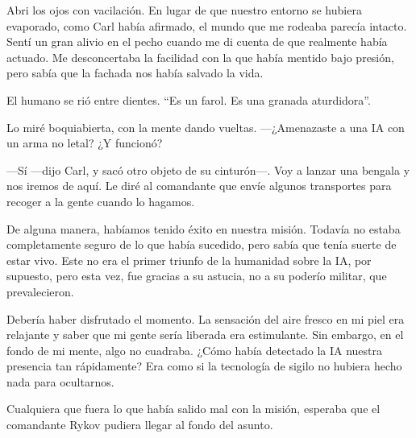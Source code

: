 Abri los ojos con vacilación. En lugar de que nuestro entorno se hubiera evaporado, como Carl había afirmado, el mundo que me rodeaba parecía intacto. Sentí un gran alivio en el pecho cuando me di cuenta de que realmente había actuado. Me desconcertaba la facilidad con la que había mentido bajo presión, pero sabía que la fachada nos había salvado la vida.

El humano se rió entre dientes. “Es un farol. Es una granada aturdidora”.

Lo miré boquiabierta, con la mente dando vueltas. —¿Amenazaste a una IA con un arma no letal? ¿Y funcionó?

—Sí —dijo Carl, y sacó otro objeto de su cinturón—. Voy a lanzar una bengala y nos iremos de aquí. Le diré al comandante que envíe algunos transportes para recoger a la gente cuando lo hagamos.

De alguna manera, habíamos tenido éxito en nuestra misión. Todavía no estaba completamente seguro de lo que había sucedido, pero sabía que tenía suerte de estar vivo. Este no era el primer triunfo de la humanidad sobre la IA, por supuesto, pero esta vez, fue gracias a su astucia, no a su poderío militar, que prevalecieron.

Debería haber disfrutado el momento. La sensación del aire fresco en mi piel era relajante y saber que mi gente sería liberada era estimulante. Sin embargo, en el fondo de mi mente, algo no cuadraba. ¿Cómo había detectado la IA nuestra presencia tan rápidamente? Era como si la tecnología de sigilo no hubiera hecho nada para ocultarnos.

Cualquiera que fuera lo que había salido mal con la misión, esperaba que el comandante Rykov pudiera llegar al fondo del asunto.